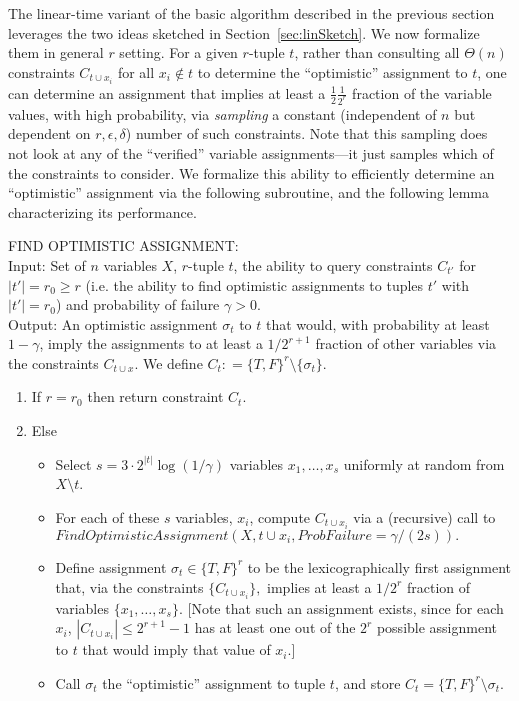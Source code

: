 \documentclass[anon,12pt]{colt2018}
\newcommand{\eps}{\epsilon}
\begin{document}
The linear-time variant of the basic algorithm described in the previous section leverages the two ideas sketched in Section~\ref{sec:linSketch}.  We now formalize them in general $r$ setting.  For a given $r$-tuple $t$, rather than consulting all $\Theta(n)$ constraints $C_{t \cup x_i}$ for all $x_i \not \in t$ to determine the ``optimistic'' assignment to $t$, one can determine an assignment that implies at least a $\frac{1}{2}\frac{1}{2^r}$ fraction of the variable values, with high probability, via \emph{sampling} a constant  (independent of $n$ but dependent on $r, \eps, \delta$) number of such constraints.  Note that this sampling does not look at any of the ``verified'' variable assignments---it just samples which of the constraints to consider.   We formalize this ability to efficiently determine an ``optimistic'' assignment via the following subroutine, and the following lemma characterizing its performance.

\vspace{-.4cm}\begin{algorithm}[H]
FIND OPTIMISTIC ASSIGNMENT:\\
Input: Set of $n$ variables $X$, $r$-tuple $t$, the ability to query constraints $C_{t'}$ for $|t'|=r_0 \ge r$ (i.e. the ability to find optimistic assignments to tuples $t'$ with $|t'| = r_0$) and probability of failure $\gamma > 0$.\\
Output: An optimistic assignment $\sigma_t$ to $t$ that would, with probability at least $1-\gamma$, imply the assignments to at least a $1/2^{r+1}$ fraction of other variables via the constraints $C_{t \cup x}$.    We define $C_t : = \{T,F\}^r \setminus \{\sigma_t\}.$
\begin{enumerate}
\item If $r=r_0$ then return constraint $C_t$.
\item Else
\begin{itemize}
\item Select $s = 3\cdot 2^{|t|} \log (1/\gamma)$ variables $x_1,\ldots, x_s$ uniformly at random from $X \setminus t$.
\item For each of these $s$ variables, $x_i$, compute $C_{t \cup x_i}$ via a (recursive) call to $FindOptimisticAssignment(X, t\cup x_i, ProbFailure = \gamma/(2s)).$
\item Define assignment $\sigma_t \in \{T,F\}^r$ to be the lexicographically first assignment that, via the constraints $\{C_{t \cup x_i} \},$ implies at least a $1/2^r$ fraction of variables $\{x_1,\ldots,x_s\}$.  [Note that such an assignment exists, since for each $x_i$,  $|C_{t \cup x_i}| \le 2^{r+1}-1$ has at least one out of the $2^r$ possible assignment to $t$ that would imply that value of $x_i$.]
\item Call $\sigma_t$ the ``optimistic'' assignment to tuple $t$, and store $C_t = \{T,F\}^r \setminus \sigma_t.$
\end{itemize}
\end{enumerate}
\end{algorithm}
\end{document}
